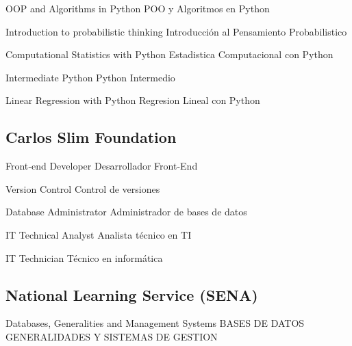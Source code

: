 \begin{multicols}{2}
\begin{cvlist}
		\cvitem
		{OOP and Algorithms in Python}
		{POO y Algoritmos en Python}
		
		\cvitem
		{Introduction to probabilistic thinking}
		{Introducción al Pensamiento Probabilistico}
		
		\cvitem 
		{Computational Statistics with Python}
		{Estadistica Computacional con Python}
		
		\cvitem
		{Intermediate Python}
		{Python Intermedio}

		\cvitem
		{Linear Regression with Python}
		{Regresion Lineal con Python}
		
	\end{cvlist}
	\subsection{Carlos Slim Foundation}
	\begin{cvlist}
		\cvitem
		{Front‑end Developer}
		{Desarrollador Front-End}
		
		\cvitem
		{Version Control}
		{Control de versiones}
		
		\cvitem
		{Database Administrator}
		{Administrador de bases de datos}
		
		\cvitem 
		{IT Technical Analyst}
		{Analista técnico en TI}
		
		
		
		\cvitem
		{IT Technician}
		{Técnico en informática}
		
	\end{cvlist}
	\subsection{National Learning Service (SENA)}
	\begin{cvlist}
		
		\cvitem
		{Databases, Generalities and Management Systems}
		{BASES DE DATOS GENERALIDADES Y SISTEMAS DE GESTION}

%		
%
		

\end{cvlist}
\end{multicols}
